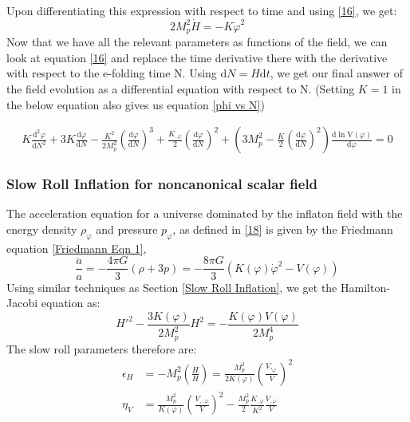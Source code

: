 \documentclass[aps,prd,reprint,preprintnumbers,showpacs,floatfix,nofootinbib,superscript address]{revtex4-2}
\begin{document}
Upon differentiating this expression with respect to time and using \ref{16}, we get:
\begin{equation} \label{20}
    2 M_p^2 \dot{H} = -  K \dot{\varphi}^2
\end{equation}
Now that we have all the relevant parameters as functions of the field, we can look at equation \ref{16} and replace the time derivative there with the derivative with respect to the e-folding time N. Using $\text{d}N = H \text{d}t$, we get our final answer of the field evolution as a differential equation with respect to N. (Setting $K = 1$ in the below equation also gives us equation \ref{phi vs N})
\begin{widetext}
\begin{subequations}
\begin{align}\label{Kphi vs N}
    K\frac{\text{d}^2\varphi}{\text{d}N^2} +3 K \frac{\text{d}\varphi}{\text{d}N}  - \frac{K^2}{2M_p^2} \left(\frac{\text{d}\varphi}{\text{d}N} \right)^3  +  \frac{K_{,\varphi}}{2}  \left(\frac{\text{d}\varphi}{\text{d}N} \right)^2 +  \left( 3 M_p^2 - \frac{K}{2} \left(\frac{\text{d}\varphi}{\text{d}N} \right)^2 \right) \frac{\text{d}\ln \text{V}(\varphi)}{\text{d} \varphi} = 0    
\end{align}
\end{subequations}
\end{widetext}
\subsubsection{Slow Roll Inflation for noncanonical scalar field}
The acceleration equation for a universe dominated by the inflaton field with the energy density $\rho_{\varphi}$ and pressure $p_{\varphi}$, as defined in \ref{18} is given by the Friedmann equation \ref{Friedmann Eqn 1},
\begin{equation}
    \frac{\ddot{a}}{a} = -\frac{4\pi G}{3} (\rho +3p) = -\frac{8\pi G}{3} (K(\varphi){\dot{\varphi}}^2 - V(\varphi)) 
\end{equation}
Using similar techniques as Section \ref{Slow Roll Inflation}, we get the Hamilton-Jacobi equation as: 
\begin{equation}    \label{KHJ}
    H'^2 - \frac{3K(\varphi)}{2M_p^2}H^2 = - \frac{K(\varphi) V(\varphi)}{2M_p^4} 
\end{equation}
The slow roll parameters therefore are:
\begin{align}
    \epsilon_H &= - M_p^2 \left(\frac{\dot{H}}{H} \right) = \frac{M_p^2}{2 K(\varphi)} \left(\frac{V,_\varphi}{V}\right)^2 \\
    \eta_V &= \frac{M_p^2}{K(\varphi)} \left( \frac{V_{,,\varphi}}{V} \right)^2 - \frac{M_p^2}{2} \frac{K_{,\varphi}}{K^2} \frac{V_{,\varphi}}{V}
\end{align}
\end{document}
